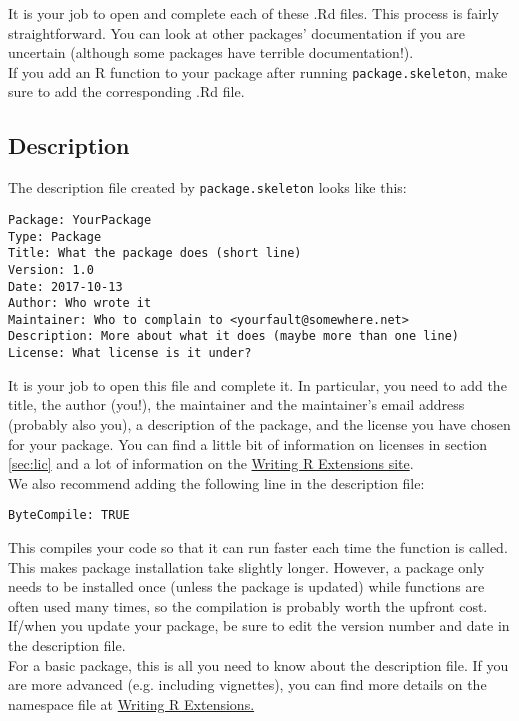 \documentclass{article}
\begin{document}
It is your job to open and complete each of these  .Rd files. This process is fairly straightforward. You can look at other packages'  documentation if you are uncertain (although some packages have terrible documentation!). \\

If you add an R function to your package after running \texttt{package.skeleton}, make sure to add the corresponding .Rd file.


\subsection{Description}
The description file created by  \texttt{package.skeleton} looks like this:
\begin{verbatim}
Package: YourPackage
Type: Package
Title: What the package does (short line)
Version: 1.0
Date: 2017-10-13
Author: Who wrote it
Maintainer: Who to complain to <yourfault@somewhere.net>
Description: More about what it does (maybe more than one line)
License: What license is it under?
\end{verbatim}
It is your job to open this file and complete it. In particular, you need to add the title, the author (you!), the maintainer and the maintainer's email address (probably also you), a description of the package, and the license you have chosen for your package. You can find a little bit of information on licenses in section \ref{sec:lic} and a lot of information on the \href{https://cran.r-project.org/doc/manuals/R-exts.html#Licensing}{Writing R Extensions site}. \\

We also recommend adding the following line in the description file:
\begin{verbatim}
ByteCompile: TRUE
\end{verbatim}
This compiles your code so that it can run faster each time the function is called. This makes package installation take slightly longer. However, a package only needs to be installed once (unless the package is updated) while functions are often used many times, so the compilation is probably worth the upfront cost.\\

If/when you update your package, be sure to edit the version number and date in the description file. \\ 

For a basic package, this is all you need to know about the description file. If you are more advanced (e.g. including vignettes), you can find more details on the namespace file at  \href{https://cran.r-project.org/doc/manuals/R-exts.html#The-DESCRIPTION-file}{Writing R Extensions.}
\end{document}
